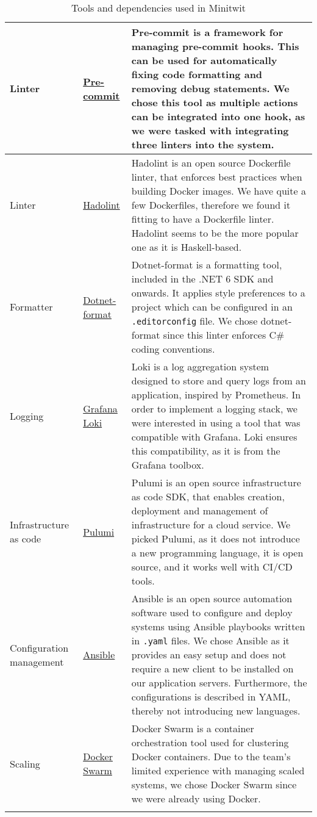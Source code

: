 \begin{longtable}{|p{}|p{} | p{}|}
    \hline
    Linter & \href{https://pre-commit.com/}{Pre-commit} & Pre-commit is a framework for managing pre-commit hooks. This can be used for automatically fixing code formatting and removing debug statements. We chose this tool as multiple actions can be integrated into one hook, as we were tasked with integrating three linters into the system.\\
    \hline
    Linter & \href{https://github.com/hadolint/hadolint}{Hadolint} & Hadolint is an open source Dockerfile linter, that enforces best practices when building Docker images. We have quite a few Dockerfiles, therefore we found it fitting to have a Dockerfile linter. Hadolint seems to be the more popular one as it is Haskell-based.\\
    \hline
    Formatter & \href{https://learn.microsoft.com/en-us/dotnet/core/tools/dotnet-format}{Dotnet-format} & Dotnet-format is a formatting tool, included in the .NET 6 SDK and onwards. It applies style preferences to a project which can be configured in an \texttt{.editorconfig} file. We chose dotnet-format since this linter enforces C\# coding conventions.\\
    \hline
    Logging & \href{https://grafana.com/docs/loki/latest/}{Grafana Loki} & Loki is a log aggregation system designed to store and query logs from an application, inspired by Prometheus. In order to implement a logging stack, we were interested in using a tool that was compatible with Grafana. Loki ensures this compatibility, as it is from the Grafana toolbox.\\
    \hline
    Infrastructure as code & \href{https://www.pulumi.com/docs/}{Pulumi} & Pulumi is an open source infrastructure as code SDK, that enables creation, deployment and management of infrastructure for a cloud service. We picked Pulumi, as it does not introduce a new programming language, it is open source, and it works well with CI/CD tools.\\
    \hline
    Configuration management & \href{https://docs.ansible.com/}{Ansible} & Ansible is an open source automation software used to configure and deploy systems using Ansible playbooks written in \texttt{.yaml} files. We chose Ansible as it provides an easy setup and does not require a new client to be installed on our application servers. Furthermore, the configurations is described in YAML, thereby not introducing new languages.\\
    \hline
    Scaling & \href{https://docs.docker.com/reference/cli/docker/swarm/}{Docker Swarm} & Docker Swarm is a container orchestration tool used for clustering Docker containers. Due to the team's limited experience with managing scaled systems, we chose Docker Swarm since we were already using Docker.\\
    \hline
    \caption{Tools and dependencies used in Minitwit}
    \label{tab:tool}
\end{longtable}
